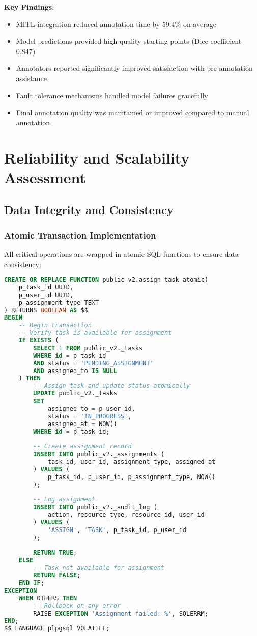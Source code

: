 \textbf{Key Findings}:
\begin{itemize}
    \item MITL integration reduced annotation time by 59.4\% on average
    \item Model predictions provided high-quality starting points (Dice coefficient 0.847)
    \item Annotators reported significantly improved satisfaction with pre-annotation assistance
    \item Fault tolerance mechanisms handled model failures gracefully
    \item Final annotation quality was maintained or improved compared to manual annotation
\end{itemize}

\section{Reliability and Scalability Assessment}
\label{sec:reliability-scalability}

\subsection{Data Integrity and Consistency}

\subsubsection{Atomic Transaction Implementation}

All critical operations are wrapped in atomic SQL functions to ensure data consistency:

\begin{lstlisting}[language=sql, caption=Atomic Task Assignment Function]
CREATE OR REPLACE FUNCTION public_v2.assign_task_atomic(
    p_task_id UUID,
    p_user_id UUID,
    p_assignment_type TEXT
) RETURNS BOOLEAN AS $$
BEGIN
    -- Begin transaction
    -- Verify task is available for assignment
    IF EXISTS (
        SELECT 1 FROM public_v2._tasks 
        WHERE id = p_task_id 
        AND status = 'PENDING_ASSIGNMENT'
        AND assigned_to IS NULL
    ) THEN
        -- Assign task and update status atomically
        UPDATE public_v2._tasks 
        SET 
            assigned_to = p_user_id,
            status = 'IN_PROGRESS',
            assigned_at = NOW()
        WHERE id = p_task_id;
        
        -- Create assignment record
        INSERT INTO public_v2._assignments (
            task_id, user_id, assignment_type, assigned_at
        ) VALUES (
            p_task_id, p_user_id, p_assignment_type, NOW()
        );
        
        -- Log assignment
        INSERT INTO public_v2._audit_log (
            action, resource_type, resource_id, user_id
        ) VALUES (
            'ASSIGN', 'TASK', p_task_id, p_user_id
        );
        
        RETURN TRUE;
    ELSE
        -- Task not available for assignment
        RETURN FALSE;
    END IF;
EXCEPTION
    WHEN OTHERS THEN
        -- Rollback on any error
        RAISE EXCEPTION 'Assignment failed: %', SQLERRM;
END;
$$ LANGUAGE plpgsql VOLATILE;
\end{lstlisting}

